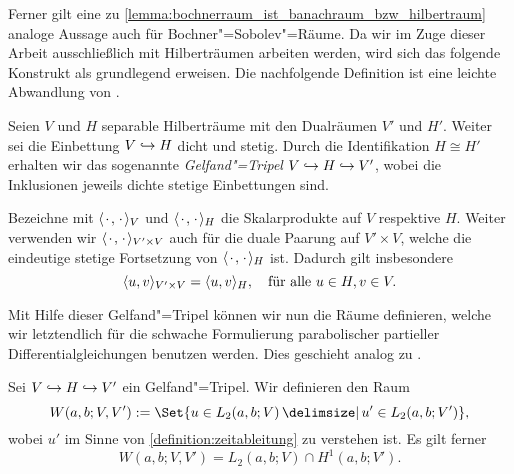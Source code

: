\documentclass[../main.tex]{subfiles}
\begin{document}
Ferner gilt eine zu \cref{lemma:bochnerraum_ist_banachraum_bzw_hilbertraum} analoge Aussage auch für Bochner"=Sobolev"=Räume.
Da wir im Zuge dieser Arbeit ausschließlich mit Hilberträumen arbeiten werden, wird sich das folgende Konstrukt als grundlegend erweisen.
Die nachfolgende Definition ist eine leichte Abwandlung von \cite[Abschnitt 10.2]{Schweizer2013}.

\begin{Definition}
\label{definition:gelfand_tripel}
    Seien $V$ und $H$ separable Hilberträume mit den Dualräumen $V'$ und $H'$.
    Weiter sei die Einbettung $V \denseinclusion H$ dicht und stetig.
    Durch die Identifikation $H \cong H'$ erhalten wir das sogenannte \emph{Gelfand"=Tripel} $V \denseinclusion H \denseinclusion V'$, wobei die Inklusionen jeweils dichte stetige Einbettungen sind.
\end{Definition}

\begin{Bemerkung}
\label{bemerkung:skalarprodukte_und_duality_pairing}
    Bezeichne mit $\skp{\blank}{\blank}{V}$ und $\skp{\blank}{\blank}{H}$ die Skalarprodukte auf $V$ respektive $H$.
    Weiter verwenden wir $\skp{\blank}{\blank}{V' \times V}$ auch für die duale Paarung auf $V' \times V$, welche die eindeutige stetige Fortsetzung von $\skp{\blank}{\blank}{H}$ ist.
    Dadurch gilt insbesondere
    \begin{equation}
        \skp{u}{v}{V' \times V} = \skp{u}{v}{H}, \quad \fa u \in H, v \in V.
    \end{equation}
\end{Bemerkung}

Mit Hilfe dieser Gelfand"=Tripel können wir nun die Räume definieren, welche wir letztendlich für die schwache Formulierung parabolischer partieller Differentialgleichungen benutzen werden.
Dies geschieht analog zu \cite[Definition XVIII.2.4]{Dautray:1992by}.

\begin{Definition}
\label{definition:bochner_raum_W}
    Sei $V \denseinclusion H \denseinclusion V'$ ein Gelfand"=Tripel.
    Wir definieren den Raum
    \begin{equation}
        W(a, b; V, V') := \Set{u \in L_{2}(a, b; V) \given u' \in L_{2}(a, b; V')},
    \end{equation}
    wobei $u'$ im Sinne von \cref{definition:zeitableitung} zu verstehen ist.
    Es gilt ferner
    \begin{equation}
        W(a, b; V, V') = L_{2}(a, b; V) \cap H^{1}(a, b; V').
    \end{equation}
\end{Definition}
\end{document}
